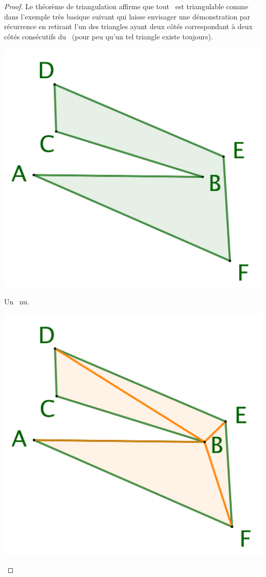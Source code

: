 \begin{proof}
    Le théorème de triangulation affirme que tout \ngone\ est triangulable comme dans l'exemple très basique suivant qui laisse envisager une démonstration par récurrence en retirant l'un des triangles ayant deux côtés correspondant à deux côtés consécutifs du \ngone\ (pour peu qu'un tel triangle existe toujours).

    
    \begin{multicols}{3}
        \small\itshape
        \begin{center}
            \includegraphics[scale=.4]{content/polygon/sufficient-cond/triangulation-1.png}
        
            \smallskip
            Un \ngone\ nu.
        \end{center}

    
        \begin{center}
            \includegraphics[scale=.4]{content/polygon/sufficient-cond/triangulation-2.png}
        

\end{center}
\end{multicols}
\end{proof}
